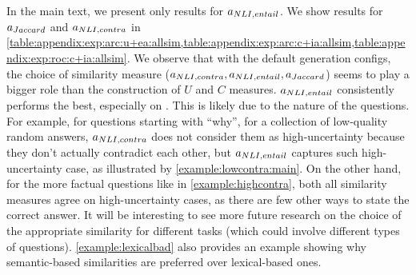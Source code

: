
In the main text, we present only results for $a_{NLI,entail}$.
We show results for $a_{Jaccard}$ and $a_{NLI,contra}$ in \cref{table:appendix:exp:arc:u+ea:allsim,table:appendix:exp:arc:c+ia:allsim,table:appendix:exp:roc:c+ia:allsim}.
We observe that with the default generation configs, the choice of similarity measure ($a_{NLI,contra}, a_{NLI,entail}, a_{Jaccard}$) seems to play a bigger role than the construction of $U$ and $C$ measures. 
$a_{NLI,entail}$ consistently performs the best, especially on \datasetnqopen.
This is likely due to the nature of the questions.
For example, for questions starting with ``why'', for a collection of low-quality random answers, $a_{NLI,contra}$ does not consider them as high-uncertainty because they don't actually contradict each other, but $a_{NLI,entail}$ captures such high-uncertainty case, as illustrated by \cref{example:lowcontra:main}.
On the other hand, for the more factual questions like in \cref{example:highcontra}, both all similarity measures agree on high-uncertainty cases, as there are few other ways to state the correct answer.
It will be interesting to see more future research on the choice of the appropriate similarity for different tasks (which could involve different types of questions).
\cref{example:lexicalbad} also provides an example showing why semantic-based similarities are preferred over lexical-based ones.

